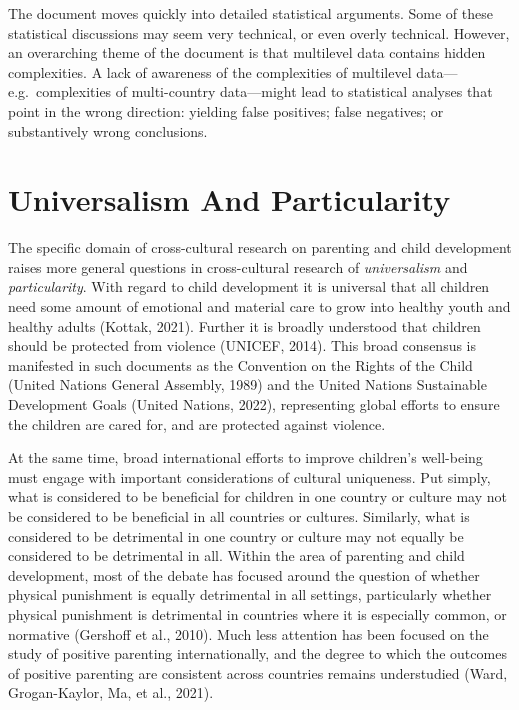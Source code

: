 \documentclass[
  letterpaper,
  DIV=11,
  numbers=noendperiod]{scrreprt}
\begin{document}
The document moves quickly into detailed statistical arguments. Some of
these statistical discussions may seem very technical, or even overly
technical. However, an overarching theme of the document is that
multilevel data contains hidden complexities. A lack of awareness of the
complexities of multilevel data---e.g.~complexities of multi-country
data---might lead to statistical analyses that point in the wrong
direction: yielding false positives; false negatives; or substantively
wrong conclusions.

\hypertarget{universalism-and-particularity}{%
\section{Universalism And
Particularity}\label{universalism-and-particularity}}

The specific domain of cross-cultural research on parenting and child
development raises more general questions in cross-cultural research of
\emph{universalism} and \emph{particularity}. With regard to child
development it is universal that all children need some amount of
emotional and material care to grow into healthy youth and healthy
adults (Kottak, 2021). Further it is broadly understood that children
should be protected from violence (UNICEF, 2014). This broad consensus
is manifested in such documents as the Convention on the Rights of the
Child (United Nations General Assembly, 1989) and the United Nations
Sustainable Development Goals (United Nations, 2022), representing
global efforts to ensure the children are cared for, and are protected
against violence.

At the same time, broad international efforts to improve children's
well-being must engage with important considerations of cultural
uniqueness. Put simply, what is considered to be beneficial for children
in one country or culture may not be considered to be beneficial in all
countries or cultures. Similarly, what is considered to be detrimental
in one country or culture may not equally be considered to be
detrimental in all. Within the area of parenting and child development,
most of the debate has focused around the question of whether physical
punishment is equally detrimental in all settings, particularly whether
physical punishment is detrimental in countries where it is especially
common, or normative (Gershoff et al., 2010). Much less attention has
been focused on the study of positive parenting internationally, and the
degree to which the outcomes of positive parenting are consistent across
countries remains understudied (Ward, Grogan-Kaylor, Ma, et al., 2021).
\end{document}
